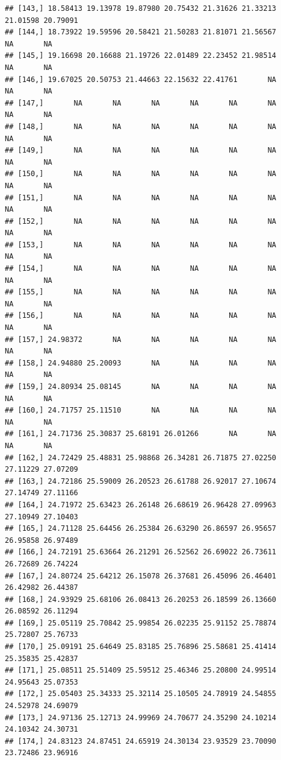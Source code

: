 \documentclass{article}\usepackage[]{graphicx}\usepackage[]{color}
\makeatletter
\newenvironment{kframe}{%
 \def\at@end@of@kframe{}%
 \ifinner\ifhmode%
  \def\at@end@of@kframe{\end{minipage}}%
  \begin{minipage}{\columnwidth}%
 \fi\fi%
 \def\FrameCommand##1{\hskip\@totalleftmargin \hskip-\fboxsep
 \colorbox{shadecolor}{##1}\hskip-\fboxsep
     \hskip-\linewidth \hskip-\@totalleftmargin \hskip\columnwidth}%
 \MakeFramed {\advance\hsize-\width
   \@totalleftmargin\z@ \linewidth\hsize
   \@setminipage}}%
 {\par\unskip\endMakeFramed%
 \at@end@of@kframe}
\newenvironment{knitrout}{}{} %
\makeatother
\begin{document}
\begin{knitrout}
\begin{kframe}
\begin{verbatim}
## [143,] 18.58413 19.13978 19.87980 20.75432 21.31626 21.33213 21.01598 20.79091
## [144,] 18.73922 19.59596 20.58421 21.50283 21.81071 21.56567       NA       NA
## [145,] 19.16698 20.16688 21.19726 22.01489 22.23452 21.98514       NA       NA
## [146,] 19.67025 20.50753 21.44663 22.15632 22.41761       NA       NA       NA
## [147,]       NA       NA       NA       NA       NA       NA       NA       NA
## [148,]       NA       NA       NA       NA       NA       NA       NA       NA
## [149,]       NA       NA       NA       NA       NA       NA       NA       NA
## [150,]       NA       NA       NA       NA       NA       NA       NA       NA
## [151,]       NA       NA       NA       NA       NA       NA       NA       NA
## [152,]       NA       NA       NA       NA       NA       NA       NA       NA
## [153,]       NA       NA       NA       NA       NA       NA       NA       NA
## [154,]       NA       NA       NA       NA       NA       NA       NA       NA
## [155,]       NA       NA       NA       NA       NA       NA       NA       NA
## [156,]       NA       NA       NA       NA       NA       NA       NA       NA
## [157,] 24.98372       NA       NA       NA       NA       NA       NA       NA
## [158,] 24.94880 25.20093       NA       NA       NA       NA       NA       NA
## [159,] 24.80934 25.08145       NA       NA       NA       NA       NA       NA
## [160,] 24.71757 25.11510       NA       NA       NA       NA       NA       NA
## [161,] 24.71736 25.30837 25.68191 26.01266       NA       NA       NA       NA
## [162,] 24.72429 25.48831 25.98868 26.34281 26.71875 27.02250 27.11229 27.07209
## [163,] 24.72186 25.59009 26.20523 26.61788 26.92017 27.10674 27.14749 27.11166
## [164,] 24.71972 25.63423 26.26148 26.68619 26.96428 27.09963 27.10949 27.10403
## [165,] 24.71128 25.64456 26.25384 26.63290 26.86597 26.95657 26.95858 26.97489
## [166,] 24.72191 25.63664 26.21291 26.52562 26.69022 26.73611 26.72689 26.74224
## [167,] 24.80724 25.64212 26.15078 26.37681 26.45096 26.46401 26.42982 26.44387
## [168,] 24.93929 25.68106 26.08413 26.20253 26.18599 26.13660 26.08592 26.11294
## [169,] 25.05119 25.70842 25.99854 26.02235 25.91152 25.78874 25.72807 25.76733
## [170,] 25.09191 25.64649 25.83185 25.76896 25.58681 25.41414 25.35835 25.42837
## [171,] 25.08511 25.51409 25.59512 25.46346 25.20800 24.99514 24.95643 25.07353
## [172,] 25.05403 25.34333 25.32114 25.10505 24.78919 24.54855 24.52978 24.69079
## [173,] 24.97136 25.12713 24.99969 24.70677 24.35290 24.10214 24.10342 24.30731
## [174,] 24.83123 24.87451 24.65919 24.30134 23.93529 23.70090 23.72486 23.96916

\end{verbatim}
\end{kframe}
\end{knitrout}
\end{document}
